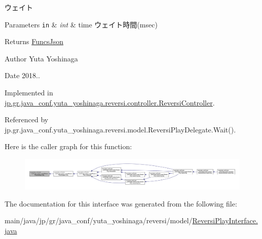 ウェイト 


\begin{DoxyParams}[1]{Parameters}
\mbox{\tt in}  & {\em int} & time ウェイト時間(msec) \\
\hline
\end{DoxyParams}
\begin{DoxyReturn}{Returns}
\hyperlink{classjp_1_1gr_1_1java__conf_1_1yuta__yoshinaga_1_1reversi_1_1model_1_1_funcs_json}{Funcs\+Json} 
\end{DoxyReturn}
\begin{DoxyAuthor}{Author}
Yuta Yoshinaga 
\end{DoxyAuthor}
\begin{DoxyDate}{Date}
2018.. 
\end{DoxyDate}


Implemented in \hyperlink{classjp_1_1gr_1_1java__conf_1_1yuta__yoshinaga_1_1reversi_1_1controller_1_1_reversi_controller_a4f290c6bccc40ff5239ef8047bb644d8}{jp.\+gr.\+java\+\_\+conf.\+yuta\+\_\+yoshinaga.\+reversi.\+controller.\+Reversi\+Controller}.



Referenced by jp.\+gr.\+java\+\_\+conf.\+yuta\+\_\+yoshinaga.\+reversi.\+model.\+Reversi\+Play\+Delegate.\+Wait().

Here is the caller graph for this function\+:
\nopagebreak
\begin{figure}[H]
\begin{center}
\leavevmode
\includegraphics[width=350pt]{interfacejp_1_1gr_1_1java__conf_1_1yuta__yoshinaga_1_1reversi_1_1model_1_1_reversi_play_interface_ad89b0c606489a4a89d2778f7ad4c19dc_icgraph}
\end{center}
\end{figure}


The documentation for this interface was generated from the following file\+:\begin{DoxyCompactItemize}
\item 
main/java/jp/gr/java\+\_\+conf/yuta\+\_\+yoshinaga/reversi/model/\hyperlink{_reversi_play_interface_8java}{Reversi\+Play\+Interface.\+java}\end{DoxyCompactItemize}
